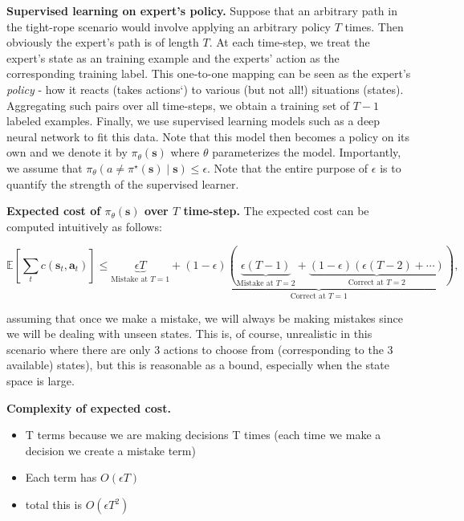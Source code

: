 \documentclass{article}
\newcommand{\state}{\mathbf{s}}
\newcommand{\action}{\mathbf{a}}
\newcommand{\expert}{\pi^{\star}}
\begin{document}
\textbf{Supervised learning on expert's policy.} Suppose that an arbitrary path in the tight-rope scenario would involve applying an arbitrary policy $T$ times. Then obviously the expert's path is of length $T$. At each time-step, we treat the expert's state as an training example and the experts' action as the corresponding training label. This one-to-one mapping can be seen as the expert's \textit{policy} - how it reacts (takes actions`) to various (but not all!) situations (states). Aggregating such pairs over all time-steps, we obtain a training set of $T-1$ labeled examples. Finally, we use supervised learning models such as a deep neural network to fit this data. Note that this model then becomes a policy on its own and we denote it by $\pi_{\theta}(\state)$ where $\theta$ parameterizes the model. Importantly, we assume that $\pi_\theta(a \neq \expert(\state) \mid \state) \leq \epsilon$. Note that the entire purpose of $\epsilon$ is to quantify the strength of the supervised learner.

\vspace{1mm}
\textbf{Expected cost of $\pi_{\theta}(\state)$ over $T$ time-step.} The expected cost can be computed intuitively as follows:

$$
\mathbb{E}\left[\sum_{t} c(\state_t, \action_t)\right] \leq
\underbrace{\epsilon T}_{\text{Mistake at }T=1} +
\underbrace{
	(1 - \epsilon)(
		\underbrace{\epsilon (T-1)}_{\text{Mistake at }T=2}
		+
		\underbrace{(1-\epsilon)(\epsilon(T-2)+\cdots)}_{\text{Correct at }T=2}
	)
}_{\text{Correct at }T=1},
$$

assuming that once we make a mistake, we will always be making mistakes since we will be dealing with unseen states. This is, of course, unrealistic in this scenario where there are only 3 actions to choose from (corresponding to the 3 available) states), but this is reasonable as a bound, especially when the state space is large.

\vspace{1mm}

\textbf{Complexity of expected cost.}

\begin{itemize}
	\item T terms because we are making decisions T times (each time we make a decision we create a mistake term)
	\item Each term has $O(\epsilon T)$
	\item total this is $O(\epsilon T^2)$
\end{itemize}
\end{document}
